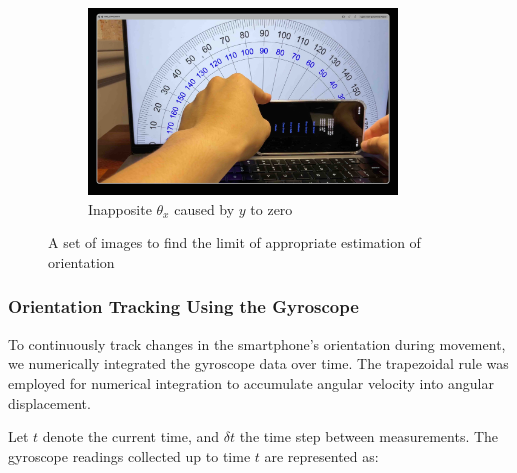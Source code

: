 \documentclass{article}
\begin{document}
\begin{figure}[ht]
\begin{subfigure}
            \caption{Error caused by zero $\theta_{x}$}
            \label{fig:2_1_3_3}
        \end{subfigure}
        \begin{subfigure}
            {0.48\textwidth}
            \centering
            \includegraphics[width=0.9\textwidth]{Images/2_1_3_4.jpg}
            \caption{Inapposite $\theta_{x}$ caused by $y$ to zero}
            \label{fig:2_1_3_4}
        \end{subfigure}
        \caption{A set of images to find the limit of appropriate estimation of
        orientation}
        \label{fig:valid_range_test}
    \end{figure}

    \subsubsection{Orientation Tracking Using the Gyroscope}

    To continuously track changes in the smartphone’s orientation during movement,
    we numerically integrated the gyroscope data over time. The trapezoidal rule
    was employed for numerical integration to accumulate angular velocity into angular
    displacement.

    Let $t$ denote the current time, and $\delta t$ the time step between
    measurements. The gyroscope readings collected up to time $t$ are represented
    as:
\end{document}
